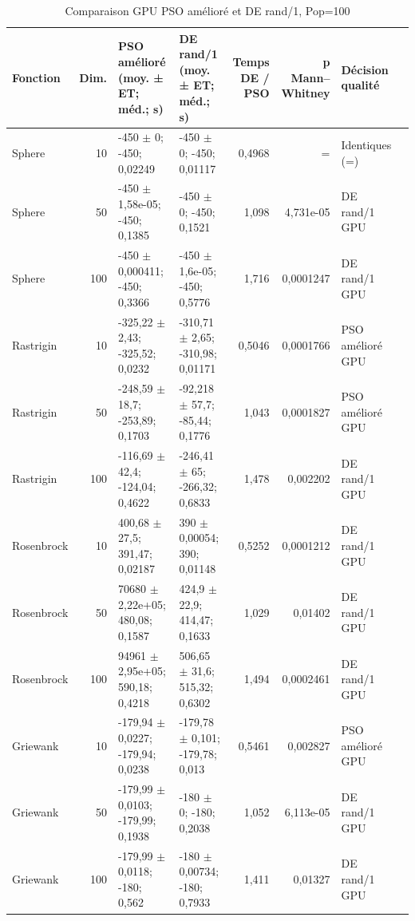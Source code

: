 \begin{table}[t]
\centering
\caption{Comparaison GPU PSO amélioré et DE rand/1, Pop=100}
\label{tab:pso-vs-de-gpu-pop100}
\scriptsize
\begin{tabular}{lrp{3.0cm}p{3.0cm}rrp{2.2cm}p{2.3cm}}
\toprule
Fonction & Dim. & PSO amélioré (moy. ± ET; méd.; s) & DE rand/1 (moy. ± ET; méd.; s) & Temps DE / PSO & p Mann–Whitney & Décision qualité \\
\midrule
Sphere & 10 & -450 $\pm$ 0; -450; 0,02249 & -450 $\pm$ 0; -450; 0,01117 & 0,4968 & = & Identiques (=) \\
Sphere & 50 & -450 $\pm$ 1,58e-05; -450; 0,1385 & -450 $\pm$ 0; -450; 0,1521 & 1,098 & 4,731e-05 & DE rand/1 GPU \\
Sphere & 100 & -450 $\pm$ 0,000411; -450; 0,3366 & -450 $\pm$ 1,6e-05; -450; 0,5776 & 1,716 & 0,0001247 & DE rand/1 GPU \\
Rastrigin & 10 & -325,22 $\pm$ 2,43; -325,52; 0,0232 & -310,71 $\pm$ 2,65; -310,98; 0,01171 & 0,5046 & 0,0001766 & PSO amélioré GPU \\
Rastrigin & 50 & -248,59 $\pm$ 18,7; -253,89; 0,1703 & -92,218 $\pm$ 57,7; -85,44; 0,1776 & 1,043 & 0,0001827 & PSO amélioré GPU \\
Rastrigin & 100 & -116,69 $\pm$ 42,4; -124,04; 0,4622 & -246,41 $\pm$ 65; -266,32; 0,6833 & 1,478 & 0,002202 & DE rand/1 GPU \\
Rosenbrock & 10 & 400,68 $\pm$ 27,5; 391,47; 0,02187 & 390 $\pm$ 0,00054; 390; 0,01148 & 0,5252 & 0,0001212 & DE rand/1 GPU \\
Rosenbrock & 50 & 70680 $\pm$ 2,22e+05; 480,08; 0,1587 & 424,9 $\pm$ 22,9; 414,47; 0,1633 & 1,029 & 0,01402 & DE rand/1 GPU \\
Rosenbrock & 100 & 94961 $\pm$ 2,95e+05; 590,18; 0,4218 & 506,65 $\pm$ 31,6; 515,32; 0,6302 & 1,494 & 0,0002461 & DE rand/1 GPU \\
Griewank & 10 & -179,94 $\pm$ 0,0227; -179,94; 0,0238 & -179,78 $\pm$ 0,101; -179,78; 0,013 & 0,5461 & 0,002827 & PSO amélioré GPU \\
Griewank & 50 & -179,99 $\pm$ 0,0103; -179,99; 0,1938 & -180 $\pm$ 0; -180; 0,2038 & 1,052 & 6,113e-05 & DE rand/1 GPU \\
Griewank & 100 & -179,99 $\pm$ 0,0118; -180; 0,562 & -180 $\pm$ 0,00734; -180; 0,7933 & 1,411 & 0,01327 & DE rand/1 GPU \\
\bottomrule
\end{tabular}
\end{table}
